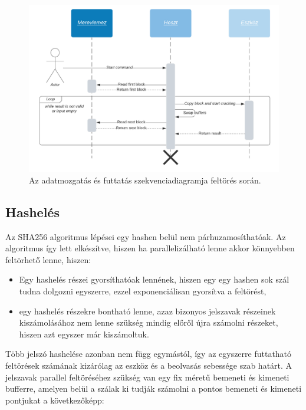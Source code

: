 \begin{figure}[H]
    \centering
    \includegraphics[width=\textwidth]{images/diagrams/sequence.pdf}
    \caption{Az adatmozgatás és futtatás szekvenciadiagramja feltörés során.}
\end{figure}



\subsection{Hashelés}

Az SHA256 algoritmus lépései egy hashen belül nem párhuzamosíthatóak. Az algoritmus így lett elkészítve, hiszen ha parallelizálható lenne akkor könnyebben feltörhető lenne, hiszen:
%
\begin{itemize}
    \item Egy hashelés részei gyorsíthatóak lennének, hiszen egy egy hashen sok szál tudna dolgozni egyszerre, ezzel exponenciálisan gyorsítva a feltörést,
    \item egy hashelés részekre bontható lenne, azaz bizonyos jelszavak részeinek kiszámolásához nem lenne szükség mindig előről újra számolni részeket, hiszen azt egyszer már kiszámoltuk.
\end{itemize}
%
Több jelszó hashelése azonban nem függ egymástól, így az egyszerre futtatható feltörések számának kizárólag az eszköz és a beolvasás sebessége szab határt. A jelszavak parallel feltöréséhez szükség van egy fix méretű bemeneti és kimeneti bufferre, amelyen belül a szálak ki tudják számolni a pontos bemeneti és kimeneti pontjukat a következőképp:

